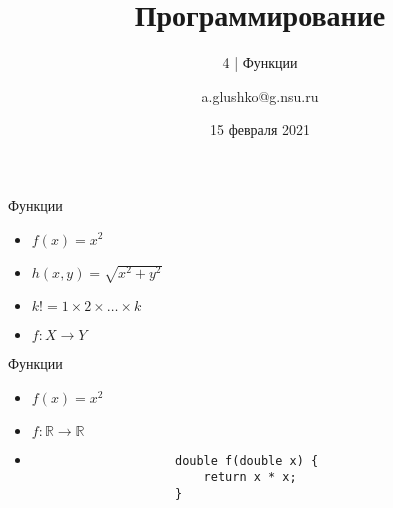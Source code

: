 \documentclass[aspectratio=169,14pt]{beamer}
\title{Программирование}
\subtitle{4 | Функции}
\author{a.glushko@g.nsu.ru}
\date{15 февраля 2021}
\begin{document}
    \begin{frame}
        \titlepage
    \end{frame}

    \begin{frame}{Функции}
        \begin{itemize}
            \item $f(x) = x^2$
            \item $h(x, y) = \sqrt{x^2 + y^2}$
            \item $k! = 1 \times 2 \times \dots \times k$
            \item<2> $f: X \rightarrow Y$
        \end{itemize}
    \end{frame}

    \begin{frame}[fragile]{Функции}
        \begin{itemize}
            \item $f(x) = x^2$
            \item $f: \mathbb{R} \rightarrow \mathbb{R}$
            \item<2->
                \begin{verbatim}
                    double f(double x) {
                        return x * x;
                    }
                \end{verbatim}
        \end{itemize}
    \end{frame}
\end{document}
